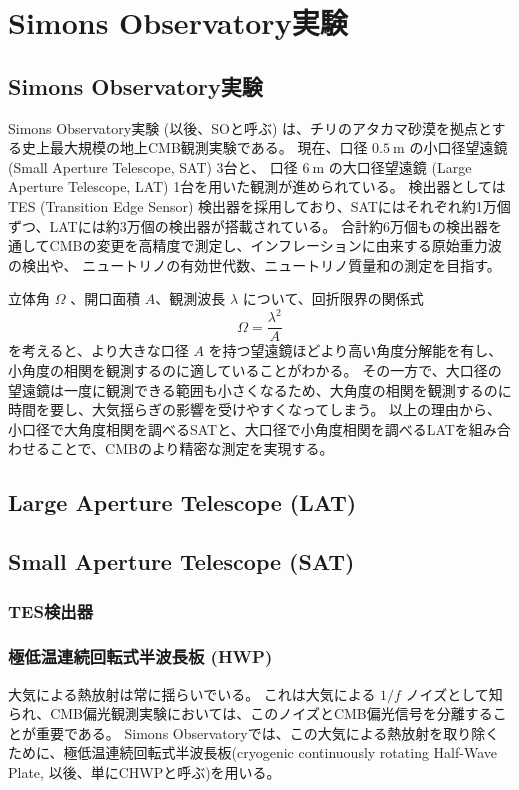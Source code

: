 \documentclass[../../main.tex]{subfiles}
\begin{document}
\chapter{Simons Observatory実験}
\section{Simons Observatory実験}
Simons Observatory実験 (以後、SOと呼ぶ) は、チリのアタカマ砂漠を拠点とする史上最大規模の地上CMB観測実験である。
現在、口径 $0.5\ \mathrm{m}$ の小口径望遠鏡 (Small Aperture Telescope, SAT) 3台と、
口径 $6\ \mathrm{m}$ の大口径望遠鏡 (Large Aperture Telescope, LAT) 1台を用いた観測が進められている。\cite{so:current_status}
検出器としてはTES (Transition Edge Sensor) 検出器を採用しており、SATにはそれぞれ約1万個ずつ、LATには約3万個の検出器が搭載されている。
合計約6万個もの検出器を通してCMBの変更を高精度で測定し、インフレーションに由来する原始重力波の検出や、
ニュートリノの有効世代数、ニュートリノ質量和の測定を目指す。\cite{so:science_forecast}

立体角 $\Omega$ 、開口面積 $A$、観測波長 $\lambda$ について、回折限界の関係式
\begin{equation}
    \Omega = \dfrac{\lambda^2}{A}
\end{equation}
を考えると、より大きな口径 $A$ を持つ望遠鏡ほどより高い角度分解能を有し、小角度の相関を観測するのに適していることがわかる。
その一方で、大口径の望遠鏡は一度に観測できる範囲も小さくなるため、大角度の相関を観測するのに時間を要し、大気揺らぎの影響を受けやすくなってしまう。
以上の理由から、小口径で大角度相関を調べるSATと、大口径で小角度相関を調べるLATを組み合わせることで、CMBのより精密な測定を実現する。

\section{Large Aperture Telescope (LAT)}
\section{Small Aperture Telescope (SAT)}
\subsection{TES検出器}

\subsection{極低温連続回転式半波長板 (HWP)}
大気による熱放射は常に揺らいでいる。
これは大気による $1/f$ ノイズとして知られ、CMB偏光観測実験においては、このノイズとCMB偏光信号を分離することが重要である。
Simons Observatoryでは、この大気による熱放射を取り除くために、極低温連続回転式半波長板(cryogenic continuously rotating Half-Wave Plate, 以後、単にCHWPと呼ぶ)を用いる。\cite{so:hwp_yamada}
\end{document}
